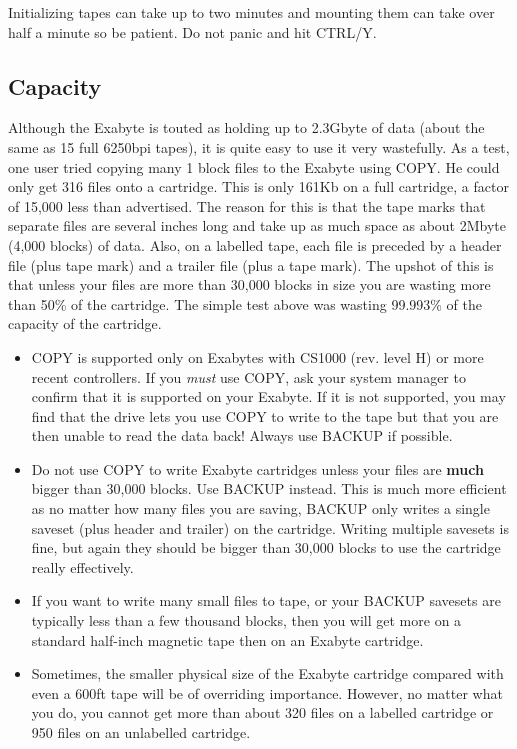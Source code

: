 Initializing tapes can take up to two minutes and mounting them can take
over half a minute so be patient. Do not panic and hit CTRL/Y.

\subsection{Capacity}

Although the Exabyte is touted as holding up to 2.3Gbyte of data (about the
same as 15 full 6250bpi tapes), it is quite easy to use it very  wastefully.
As a test,
one user tried copying many 1 block files to the Exabyte  using COPY. He
could only get 316 files onto a cartridge. This is only  161Kb on a full
cartridge, a factor of 15,000 less than  advertised. The reason for this is
that the tape marks that separate  files are several inches long and take up as
much space as about  2Mbyte (4,000 blocks) of data. Also, on a labelled tape,
each file is  preceded by a header file (plus tape mark) and a trailer file
(plus a  tape mark). The upshot of this is that unless your files are more than
30,000 blocks in size you are wasting more than 50\% of the cartridge.
The simple test above was wasting 99.993\% of the capacity of the  cartridge.

\begin{itemize}

\item COPY is supported only on Exabytes with CS1000 (rev. level H)
or more recent
controllers. If you {\it must} use COPY, ask your system manager to
confirm that it is supported on your Exabyte. If it is not supported,
you may find that the drive lets you use COPY to write to the
tape but that you are then unable to read the data back! Always
use BACKUP if possible.

\item Do not use COPY to write Exabyte cartridges unless your files are
    {\bf much} bigger than 30,000 blocks.
    Use BACKUP instead. This is much more efficient as no matter how many
    files you are saving, BACKUP only writes a single saveset (plus
    header and trailer) on the cartridge. Writing multiple savesets is
    fine, but again they should be bigger than 30,000 blocks to use
    the cartridge really effectively.

\item If you want to write many small files to tape, or your BACKUP
    savesets are typically less than a few thousand blocks, then you
    will get more on a standard half-inch magnetic tape then on an
    Exabyte cartridge.

\item Sometimes, the smaller physical size of the Exabyte cartridge
    compared with even a 600ft tape will be of overriding importance.
    However, no matter what you do, you cannot get more than about 320
    files on a labelled cartridge or 950 files on an unlabelled
    cartridge.

\end{itemize}

